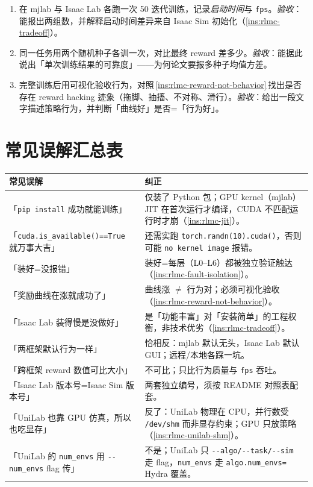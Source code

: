 \begin{practice}[跨框架对比动手任务]
\begin{enumerate}
  \item 在 mjlab 与 Isaac Lab 各跑一次 50 迭代训练，记录\emph{启动时间}与 \verb|fps|。\emph{验收}：能报出两组数，并解释启动时间差异来自 Isaac Sim 初始化（\cref{ins:rlmc-tradeoff}）。
  \item 同一任务用两个随机种子各训一次，对比最终 reward 差多少。\emph{验收}：能据此说出「单次训练结果的可靠度」——为何论文要报多种子均值方差。
  \item 完整训练后用可视化验收行为，对照\,\cref{ins:rlmc-reward-not-behavior}\,找出是否存在 reward hacking 迹象（拖脚、抽搐、不对称、滑行）。\emph{验收}：给出一段文字描述策略行为，并判断「曲线好」是否=「行为好」。
\end{enumerate}
\end{practice}

\section{常见误解汇总表}
\label{sec:rlmc-setup-misconceptions}

\begin{center}
\small
\begin{tabular}{@{}p{5.2cm}p{8.0cm}@{}}
\toprule
常见误解 & 纠正 \\
\midrule
「\texttt{pip install} 成功就能训练」 & 仅装了 Python 包；GPU kernel（mjlab）JIT 在首次运行才编译，CUDA 不匹配运行时才崩（\cref{ins:rlmc-jit}）。 \\
「\texttt{cuda.is\_available()==True} 就万事大吉」 & 还需实跑 \texttt{torch.randn(10).cuda()}，否则可能 \texttt{no kernel image} 报错。 \\
「装好=没报错」 & 装好=每层（L0--L6）都被独立验证触达（\cref{ins:rlmc-fault-isolation}）。 \\
「奖励曲线在涨就成功了」 & 曲线涨 $\ne$ 行为对；必须可视化验收（\cref{ins:rlmc-reward-not-behavior}）。 \\
「Isaac Lab 装得慢是没做好」 & 是「功能丰富」对「安装简单」的工程权衡，非技术优劣（\cref{ins:rlmc-tradeoff}）。 \\
「两框架默认行为一样」 & 恰相反：mjlab 默认无头，Isaac Lab 默认 GUI；远程/本地各踩一坑。 \\
「跨框架 reward 数值可比大小」 & 不可比；只比行为质量与 \texttt{fps} 吞吐。 \\
「Isaac Lab 版本号=Isaac Sim 版本号」 & 两套独立编号，须按 README 对照表配套。 \\
「UniLab 也靠 GPU 仿真，所以也吃显存」 & 反了：UniLab 物理在 CPU，并行数受 \texttt{/dev/shm} 而非显存约束；GPU 只放策略（\cref{ins:rlmc-unilab-shm}）。 \\
「UniLab 的 \texttt{num\_envs} 用 \texttt{-{}-num\_envs} flag 传」 & 不是；UniLab 只 \texttt{-{}-algo/-{}-task/-{}-sim} 走 flag，\texttt{num\_envs} 走 \texttt{algo.num\_envs=} Hydra 覆盖。 \\
\bottomrule
\end{tabular}
\end{center}

